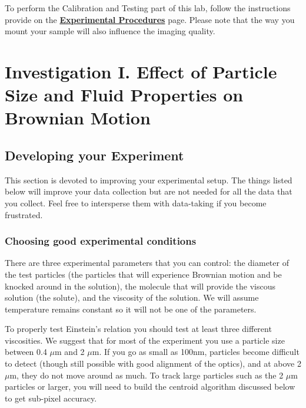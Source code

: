 \documentclass{../lab}
\begin{document}

To perform the Calibration and Testing part of this lab, follow the instructions provide on the \href{https://berkeley-physics111b.github.io/appendices/BMC-Experimental-Procedures/}{\textbf{Experimental Procedures}} page. Please note that the way you mount your sample will also influence the imaging quality.

\section{Investigation I. Effect of Particle Size and Fluid Properties on Brownian Motion}
\label{sec:InvestigationI}

\subsection{Developing your Experiment}

This section is devoted to improving your experimental setup. The things listed below will improve your data collection but are not needed for all the data that you collect. Feel free to intersperse them with data-taking if you become frustrated.

\subsubsection{Choosing good experimental conditions}

There are three experimental parameters that you can control: the diameter of the test particles (the particles that will experience Brownian motion and be knocked around in the solution), the molecule that will provide the viscous solution (the solute), and the viscosity of the solution. We will assume temperature remains constant so it will not be one of the parameters.

To properly test Einstein's relation you should test at least three different viscosities. We suggest that for most of the experiment you use a particle size between 0.4 $\mu$m and 2 $\mu$m. If you go as small as 100nm, particles become difficult to detect (though still possible with good alignment of the optics), and at above 2 $\mu$m, they do not move around as much. To track large particles such as the 2 $\mu$m particles or larger, you will need to build the centroid algorithm discussed below to get sub-pixel accuracy.
\end{document}
